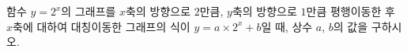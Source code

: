 함수 $y=2^x$의 그래프를 $x$축의 방향으로 $2$만큼, $y$축의 방향으로 $1$만큼 평행이동한 후 $x$축에 대하여 대칭이동한 그래프의 식이 $y=a\times 2^x+b$일 때, 상수 $a$, $b$의 값을 구하시오.
